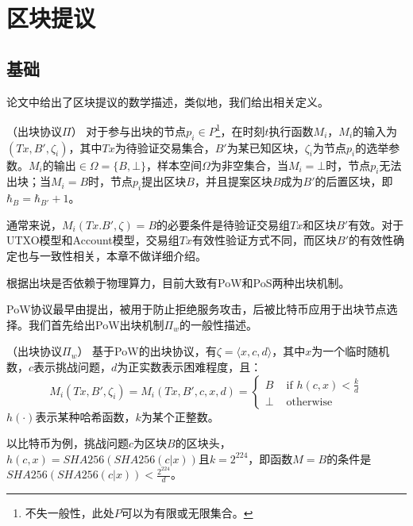 \section{区块提议}
\label{sec:leader_election}
\subsection{基础}
论文\cite{brown2018formal}中给出了区块提议的数学描述，类似地，我们给出相关定义。

\begin{definition}
（出块协议$\Pi$） 对于参与出块的节点$p_i\in P$\footnote{不失一般性，此处$P$可以为有限或无限集合。}，在时刻$t$执行函数$M_i$，$M_i$的输入为$(Tx,B',\zeta_i)$，其中$Tx$为待验证交易集合，$B'$为某已知区块，$\zeta_i$为节点$p_i$的选举参数。$M_i$的输出$\in\Omega=\{B,\bot\}$，样本空间$\Omega$为非空集合，当$M_i=\bot$时，节点$p_i$无法出块；当$M_i=B$时，节点$p_i$提出区块$B$，并且提案区块$B$成为$B'$的后置区块，即$\hbar_B=\hbar_{B'}+1$。
\end{definition}

通常来说，$M_i(Tx.B',\zeta)=B$的必要条件是待验证交易组$Tx$和区块$B'$有效。对于UTXO模型和Account模型，交易组$Tx$有效性验证方式不同，而区块$B'$的有效性确定也与一致性相关，本章不做详细介绍。

根据出块是否依赖于物理算力，目前大致有PoW和PoS两种出块机制。

PoW协议最早由\cite{dwork1992pricing}提出，被用于防止拒绝服务攻击，后被比特币应用于出块节点选择\cite{nakamoto2008bitcoin}。我们首先给出PoW出块机制$\Pi_w$的一般性描述。

\begin{definition}
（出块协议$\Pi_w$） 基于PoW的出块协议，有$\zeta=\langle x,c,d \rangle$，其中$x$为一个临时随机数，$c$表示挑战问题，$d$为正实数表示困难程度，且：\\
\begin{equation}
\label{eq:pow}
M_i(Tx,B',\zeta_i)=M_i(Tx,B',c,x,d)=\begin{cases}
B & \text{ if } h(c,x)<\frac{k}{d} \\ 
\bot & \text{ otherwise}
\end{cases}
\end{equation}
$h(\cdot)$表示某种哈希函数，$k$为某个正整数。
\end{definition}

以比特币为例，挑战问题$c$为区块$B$的区块头，$h(c,x)=SHA256(SHA256(c|x))$且$k=2^{224}$，即函数$M=B$的条件是$SHA256(SHA256(c|x))<\frac{2^{224}}{d}$。

